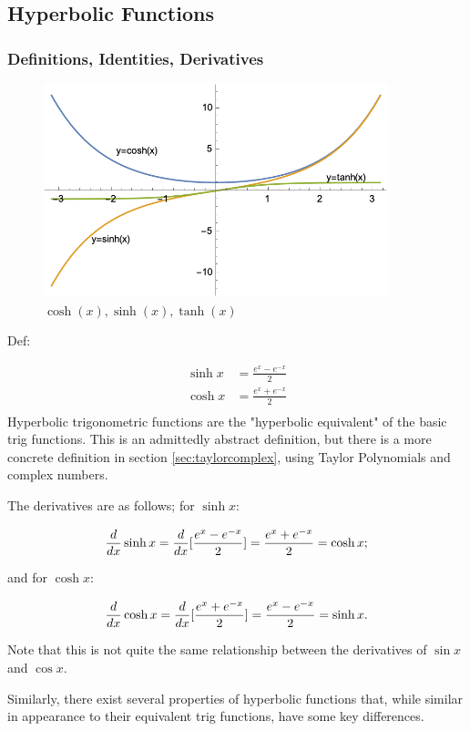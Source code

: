 \documentclass[12pt]{article}
\begin{document}
\subsection{Hyperbolic Functions}
\subsubsection{Definitions, Identities, Derivatives}
\begin{figure}[!ht]
    \centering
    \includegraphics[width=10cm]{misc/coshsinhtanh.png}
    \caption{$\cosh(x), \sinh(x), \tanh(x)$}
    \label{fig:my_label}
\end{figure}
Def:

\begin{equation}
    \begin{split}
        \sinh x &= \frac{e^x-e^{-x}}{2}\\
        \cosh x &= \frac{e^x+e^{-x}}{2}\\
    \end{split}
\end{equation}
Hyperbolic trigonometric functions are the "hyperbolic equivalent" of the basic trig functions. This is an admittedly abstract definition, but there is a more concrete definition in section \ref{sec:taylorcomplex}, using Taylor Polynomials and complex numbers.

The derivatives are as follows; for $\sinh x$:

$$\frac{d}{dx} \sinh x = \frac{d}{dx} [\frac{e^x-e^{-x}}{2}] = \frac{e^x+e^{-x}}{2} = \cosh x;$$

and for $\cosh x$:

$$\frac{d}{dx} \cosh x = \frac{d}{dx} [\frac{e^x+e^{-x}}{2}] = \frac{e^x-e^{-x}}{2} = \sinh x.$$

Note that this is not quite the same relationship between the derivatives of $\sin x$ and $\cos x$.

Similarly, there exist several properties of hyperbolic functions that, while similar in appearance to their equivalent trig functions, have some key differences.
\end{document}
